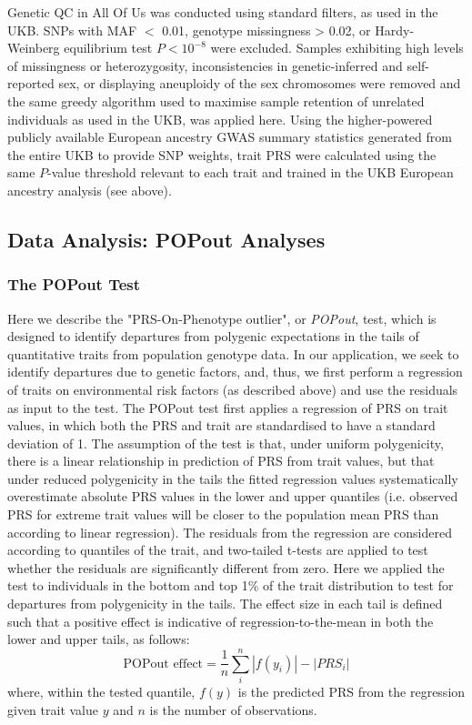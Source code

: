 \documentclass[12pt]{zHenriquesLab-StyleBioRxiv}
\begin{document}
Genetic QC in All Of Us was conducted using standard filters, as used in the UKB.  SNPs with MAF $<$ 0.01, genotype missingness > 0.02, or Hardy-Weinberg equilibrium test 
$P < 10^{-8}$ were excluded. Samples exhibiting high levels of missingness or heterozygosity, 
inconsistencies in genetic-inferred and self-reported sex, or displaying aneuploidy of the sex 
chromosomes were removed and the same greedy algorithm used to maximise sample 
retention of unrelated individuals as used in the UKB, was applied here. Using the higher-powered 
publicly available European ancestry GWAS summary statistics generated from the entire UKB \cite{neale} to provide SNP weights, trait PRS were calculated \cite{prsice} using the same $P$-value threshold relevant to each trait and trained in the UKB European ancestry analysis (see above). 




\vspace*{0.3cm} 
\subsection*{Data Analysis: POPout Analyses} \label{sec:methods:popout} 
\vspace*{-0.4cm} 
\subsubsection*{The POPout Test}
Here we describe the "PRS-On-Phenotype outlier", or \emph{POPout}, test, which is 
designed to identify departures from polygenic expectations in the tails of 
quantitative traits from population genotype data. In our application, we seek to identify 
departures due to genetic factors, and, thus, we first perform a regression of traits on 
environmental risk factors (as described above) and use the residuals as input to the test. The POPout test first applies a regression of PRS on trait values, in which both the PRS and trait are standardised to have a standard deviation of 1. The assumption of the test is that, under uniform polygenicity, there is a linear relationship in prediction of PRS from trait values, but that under reduced polygenicity in the tails the fitted regression values systematically overestimate absolute PRS values in the lower and upper quantiles (i.e. observed PRS for extreme trait values will be closer to the population mean PRS than according to linear regression). The residuals from the regression are considered according to quantiles of the trait, and two-tailed t-tests are applied to test whether the residuals are significantly different from zero. Here we applied the test to individuals in the bottom and top 1\% of the trait distribution to test for departures from polygenicity in the tails. The effect size in each tail is defined such that a positive effect is indicative of regression-to-the-mean in both the lower and upper tails, as follows:
\[
\text{POPout effect} = \frac{1}{n}\sum_i^n |{f(y_i)}| - |{PRS_i}|
\]
where, within the tested quantile, $f(y)$ is the predicted PRS from the regression given trait
value $y$ and $n$ is the number of observations.
\end{document}
